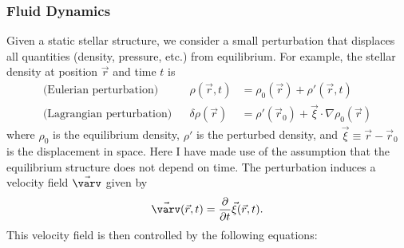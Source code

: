 \subsubsection*{Fluid Dynamics}
Given a static stellar structure, we consider a small perturbation that displaces all quantities (density, pressure, etc.) from equilibrium. %
For example, the stellar density at position $\vec r$ and time $t$ is 
\begin{align}
    \text{(Eulerian perturbation)} && 
    \rho (\vec r, t)
    &= \label{eq:eulerean}
    \rho_0 (\vec r) 
    + 
    \rho' (\vec r, t)
    \\
    \text{(Lagrangian perturbation)} &&
    \delta\rho(\vec r)
    &= \label{eq:lagrangian}
    \rho'(\vec r_0)
    +
    \vec\xi \cdot \nabla\rho_0 (\vec r)
\end{align}
where $\rho_0$ is the equilibrium density, $\rho'$ is the perturbed density, and ${\vec\xi\equiv\vec r - \vec r_0}$ is the displacement in space.
Here I have made use of the assumption that the equilibrium structure does not depend on time. 
The perturbation induces a velocity field $\vec{\varv}$ given by 
\begin{equation}
    \vec{\varv} (\vec r, t) 
    = 
    \frac{\partial}{\partial t}\vec\xi (\vec r, t).
\end{equation}
This velocity field is then controlled by the following equations: 

